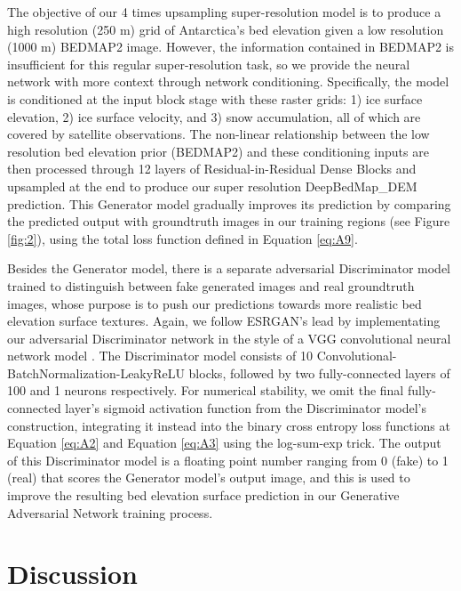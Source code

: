 \documentclass[tc, manuscript]{copernicus}
\begin{document}
The objective of our 4 times upsampling super-resolution model is to produce a high resolution (250 m) grid of Antarctica's bed elevation given a low resolution (1000 m) BEDMAP2 \citep{FretwellBedmap2improvedice2013} image.
However, the information contained in BEDMAP2 is insufficient for this regular super-resolution task, so we provide the neural network with more context through network conditioning.
Specifically, the model is conditioned at the input block stage with these raster grids: 1) ice surface elevation, 2) ice surface velocity, and 3) snow accumulation, all of which are covered by satellite observations.
The non-linear relationship between the low resolution bed elevation prior (BEDMAP2) and these conditioning inputs are then processed through 12 layers of Residual-in-Residual Dense Blocks \citep[see][]{WangESRGANEnhancedSuperResolution2018} and upsampled at the end to produce our super resolution DeepBedMap\_DEM prediction.
This Generator model gradually improves its prediction by comparing the predicted output with groundtruth images in our training regions (see Figure \ref{fig:2}), using the total loss function defined in Equation \eqref{eq:A9}.

Besides the Generator model, there is a separate adversarial Discriminator model \citep{GoodfellowGenerativeAdversarialNetworks2014} trained to distinguish between fake generated images and real groundtruth images, whose purpose is to push our predictions towards more realistic bed elevation surface textures.
Again, we follow ESRGAN's \citep{WangESRGANEnhancedSuperResolution2018} lead by implementating our adversarial Discriminator network in the style of a VGG convolutional neural network model \citep{SimonyanVeryDeepConvolutional2014}.
The Discriminator model consists of 10 Convolutional-BatchNormalization-LeakyReLU blocks, followed by two fully-connected layers of 100 and 1 neurons respectively.
For numerical stability, we omit the final fully-connected layer's sigmoid activation function from the Discriminator model's construction, integrating it instead into the binary cross entropy loss functions at Equation \eqref{eq:A2} and Equation \eqref{eq:A3} using the log-sum-exp trick.
The output of this Discriminator model is a floating point number ranging from 0 (fake) to 1 (real) that scores the Generator model's output image, and this is used to improve the resulting bed elevation surface prediction in our Generative Adversarial Network training process.


\section{Discussion}
\end{document}
